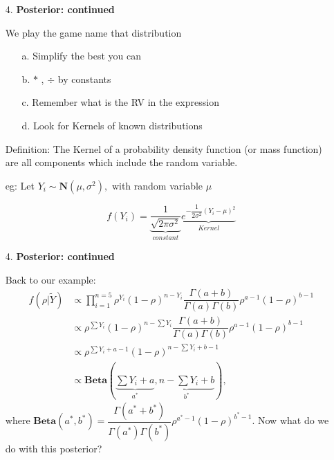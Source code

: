 \documentclass[12pt,xcolor=svgnames]{beamer}
\newcommand{\rd}{\color{red}}
\newcommand{\bl}{\color{blue}}
\newcommand{\sk}{\vspace{.4cm}}
\begin{document}
\begin{frame}
\begin{enumerate}

\item[4. ] {\bf Posterior: continued} 

We play the game {\bl name that distribution}
\begin{enumerate}
\item[a.] Simplify the best you can
\item[b.] $\ast$ , $\div$ by constants
\item[c.] Remember what is the RV in the expression
\item[d.] Look for {\bl Kernels} of known distributions
\end{enumerate}
\sk
{\rd Definition:} The {\bl Kernel} of a probability density function (or mass function) are all components which include the random variable. 

eg: Let $Y_i \sim \textbf{N}(\mu, \sigma^2),$ with random variable $\mu$

$$ f(Y_i) = \underbrace{\dfrac{1}{\sqrt{2\pi \sigma^2}}}_{constant} \underbrace{e^{-\dfrac{1}{2\sigma^2}(Y_i - \mu)^2}}_{Kernel}$$ 
\end{enumerate}
\end{frame}


\begin{frame}
\begin{enumerate}

\item[4. ] {\bf Posterior: continued} 

Back to our example: 
\begin{align*}
f(\rho|\tilde{Y}) &\propto  \prod_{i=1}^{n=5} \rho^{Y_i} (1- \rho)^{n-Y_i} \dfrac{\Gamma (a+b)}{\Gamma (a)\Gamma (b)} \rho^{a-1} (1-\rho)^{b-1}\\
&\propto \rho^{\sum Y_i} (1- \rho)^{n-\sum Y_i} \dfrac{\Gamma (a+b)}{\Gamma (a)\Gamma (b)} \rho^{a-1} (1-\rho)^{b-1}\\
&\propto \rho^{\sum Y_i +a -1} (1- \rho)^{n-\sum Y_i +b -1} \\
&\propto \textbf{Beta} \left(\underbrace{\sum Y_i +a}_{a^*}, \underbrace{n-\sum Y_i +b}_{b^*}\right),
\end{align*}
where
$ \textbf{Beta}(a^*, b^*) = \dfrac{\Gamma (a^*+b^*)}{\Gamma (a^*)\Gamma (b^*)} \rho^{a^*-1} (1-\rho)^{b^*-1}.$
{\rd Now what do we do with this posterior?}

\end{enumerate}
\end{frame}
\end{document}
